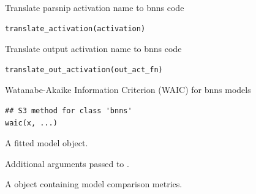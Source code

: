 \documentclass[a4paper]{book}
\begin{document}
%
\begin{Description}
Translate parsnip activation name to bnns code
\end{Description}
%
\begin{Usage}
\begin{verbatim}
translate_activation(activation)
\end{verbatim}
\end{Usage}
%
\begin{Description}
Translate output activation name to bnns code
\end{Description}
%
\begin{Usage}
\begin{verbatim}
translate_out_activation(out_act_fn)
\end{verbatim}
\end{Usage}
%
\begin{Description}
Watanabe-Akaike Information Criterion (WAIC) for bnns models
\end{Description}
%
\begin{Usage}
\begin{verbatim}
## S3 method for class 'bnns'
waic(x, ...)
\end{verbatim}
\end{Usage}
%
\begin{Arguments}
\begin{ldescription}
\item[\code{x}] A fitted  model object.

\item[\code{...}] Additional arguments passed to .
\end{ldescription}
\end{Arguments}
%
\begin{Value}
A  object containing model comparison metrics.
\end{Value}
\printindex{}
\end{document}
